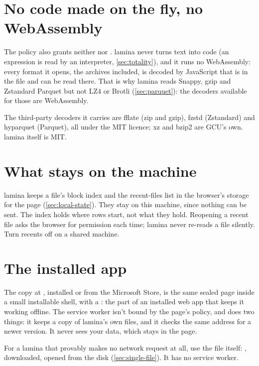 \section{No code made on the fly, no WebAssembly}\label{sec:no-eval}\label{sec:no-wasm}

The policy also grants neither  nor . lamina never turns text
into code (an expression is read by an interpreter, \cref{sec:totality}), and it runs no WebAssembly: every
format it opens, the archives included, is decoded by JavaScript that is in the file and can be read
there. That is why lamina reads Snappy, gzip and Zstandard Parquet but not LZ4 or Brotli
(\cref{sec:parquet}): the decoders available for those are WebAssembly.

The third-party decoders it carries are fflate (zip and gzip), fzstd (Zstandard) and hyparquet (Parquet),
all under the MIT licence; xz and bzip2 are GCU's own. lamina itself is MIT.

\section{What stays on the machine}\label{sec:sealed-local}

lamina keeps a file's block index and the recent-files list in the browser's storage for the page
(\cref{sec:local-state}). They stay on this machine, since nothing can be sent. The index holds where
rows start, not what they hold. Reopening a recent file asks the browser for permission each time; lamina
never re-reads a file silently. Turn recents off on a shared machine.

\section{The installed app}

The copy at , installed or from the Microsoft Store, is the same sealed page
inside a small installable shell, with a : the part of an installed web app that
keeps it working offline. The service worker isn't bound by the page's policy, and does two things: it
keeps a copy of lamina's own files, and it checks the same address for a newer version. It never sees
your data, which stays in the page.

For a lamina that provably makes no network request at all, use the file itself: ,
downloaded, opened from the disk (\cref{sec:single-file}). It has no service worker.

